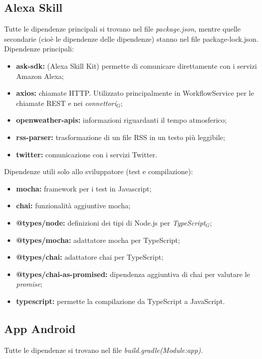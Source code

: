 \subsection{Alexa Skill}\label{ATecnologie}
Tutte le dipendenze principali si trovano nel file \textit{package.json}, mentre quelle secondarie (cioè le dipendenze delle dipendenze) stanno nel file package-lock.json.\\
Dipendenze principali:
\begin{itemize}
    \item \textbf{ask-sdk:} (Alexa Skill Kit) permette di comunicare direttamente con i servizi Amazon Alexa;
    \item \textbf{axios:} chiamate HTTP. Utilizzato principalmente in WorkflowService per le chiamate REST e nei \textit{connettori$_{G}$};
    \item \textbf{openweather-apis:} informazioni riguardanti il tempo atmosferico;
    \item \textbf{rss-parser:} trasformazione di un file RSS in un testo più leggibile;
    \item \textbf{twitter:} comunicazione con i servizi Twitter.
\end{itemize}
Dipendenze utili solo allo sviluppatore (test e compilazione):
\begin{itemize}
    \item \textbf{mocha:} framework per i test in Javascript;
    \item \textbf{chai:} funzionalità aggiuntive mocha;
    \item \textbf{@types/node:} definizioni dei tipi di Node.js per \textit{TypeScript$_{G}$};
    \item \textbf{@types/mocha:} adattatore mocha per TypeScript; 
    \item \textbf{@types/chai:} adattatore chai per TypeScript;
    \item \textbf{@types/chai-as-promised:} dipendenza aggiuntiva di chai per valutare le \textit{promise};
    \item \textbf{typescript:} permette la compilazione da TypeScript a JavaScript.
\end{itemize}

\subsection{App Android}

Tutte le dipendenze si trovano nel file \textit{build.gradle(Module:app)}.\\

